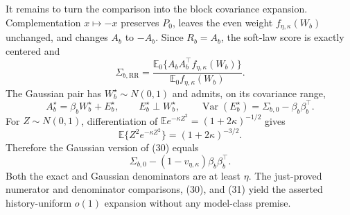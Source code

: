 It remains to turn the comparison into the block covariance expansion.  Complementation \(x\mapsto-x\) preserves \(P_0\), leaves the even weight \(f_{\eta,\kappa}(W_b)\) unchanged, and changes \(A_b\) to \(-A_b\).  Since \(R_b=A_b\), the soft-law score is exactly centered and
\[
 \Sigma_{b,\mathrm{RR}}
 =\frac{\mathbb E_0\{A_bA_b^\top f_{\eta,\kappa}(W_b)\}}
        {\mathbb E_0f_{\eta,\kappa}(W_b)}.                 \tag{30}
\]
The Gaussian pair has \(W_b^\star\sim N(0,1)\) and admits, on its covariance range,
\[
 A_b^\star=\beta_bW_b^\star+E_b^\star,
 \qquad E_b^\star\perp W_b^\star,
 \qquad\operatorname{Var}(E_b^\star)=\Sigma_{b,0}-\beta_b\beta_b^\top.
\]
For \(Z\sim N(0,1)\), differentiation of \(\mathbb Ee^{-\kappa Z^2}=(1+2\kappa)^{-1/2}\) gives
\[
 \mathbb E\{Z^2e^{-\kappa Z^2}\}=(1+2\kappa)^{-3/2}.
\]
Therefore the Gaussian version of (30) equals
\[
 \Sigma_{b,0}-(1-v_{\eta,\kappa})\beta_b\beta_b^\top.       \tag{31}
\]
Both the exact and Gaussian denominators are at least \(\eta\).  The just-proved numerator and denominator comparisons, (30), and (31) yield the asserted history-uniform \(o(1)\) expansion without any model-class premise.